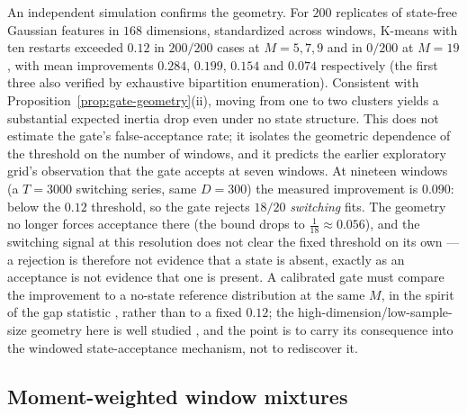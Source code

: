 \documentclass[11pt]{article}
\begin{document}
An independent simulation confirms the geometry. For $200$ replicates of
state-free Gaussian features in $168$ dimensions, standardized across windows,
K-means with ten restarts exceeded $0.12$ in $200/200$ cases at $M=5,7,9$ and in
$0/200$ at $M=19$, with mean improvements $0.284$, $0.199$, $0.154$ and $0.074$
respectively (the first three also verified by exhaustive bipartition
enumeration). Consistent with Proposition~\ref{prop:gate-geometry}(ii), moving
from one to two clusters yields a substantial expected inertia drop even under
no state structure. This does not estimate the gate's false-acceptance
rate; it isolates the geometric dependence of the threshold on the number of
windows, and it predicts the earlier exploratory grid's observation that the gate accepts at
seven windows. At nineteen windows (a $T{=}3000$ switching series, same
$D{=}300$) the measured improvement is $0.090$: below the $0.12$ threshold, so
the gate rejects $18/20$ \emph{switching} fits. The geometry no longer forces
acceptance there (the bound drops to $\tfrac1{18}\approx0.056$), and the
switching signal at this resolution does not clear the fixed threshold on its
own --- a rejection is therefore not evidence that a state is absent, exactly
as an acceptance is not evidence that one is present.
A calibrated gate must compare the improvement to a no-state reference
distribution at the same $M$, in the spirit of the gap statistic
\citep{tibshirani2001estimating}, rather than to a fixed $0.12$; the
high-dimension/low-sample-size geometry here is well studied
\citep{hall2005geometric,loog2023also}, and the point is to carry its consequence
into the windowed state-acceptance mechanism, not to rediscover it.

\subsection{Moment-weighted window mixtures}
\label{sec:window-average}
\end{document}
